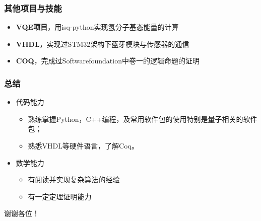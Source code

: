 \documentclass[aspectratio=1610]{beamer}
\begin{document}
\begin{frame}
\frametitle{其他项目与技能}
\begin{itemize}
    \setlength{\itemsep}{20pt}
    \item \textbf{VQE项目}，用isq-python实现氢分子基态能量的计算
    \item \textbf{VHDL}，实现过STM32架构下蓝牙模块与传感器的通信
    \item \textbf{COQ}，完成过Softwarefoundation中卷一的逻辑命题的证明
\end{itemize}
\end{frame}
\begin{frame}
    \frametitle{总结}
    \begin{itemize}
        \setlength{\itemsep}{20pt}
        \item 代码能力
        \begin{itemize}
        \setlength{\itemsep}{10pt}

            \item 熟练掌握Python，C++编程，及常用软件包的使用特别是量子相关的软件包；
            \item 熟悉VHDL等硬件语言，了解Coq。
        \end{itemize}
        \item 数学能力
        \begin{itemize}
        \setlength{\itemsep}{10pt}

            \item 有阅读并实现复杂算法的经验
            \item 有一定定理证明能力
        \end{itemize}
    \end{itemize}
    \end{frame}
\begin{frame}
\begin{center}
    \huge
    谢谢各位！
\end{center}
\end{frame}
\end{document}
